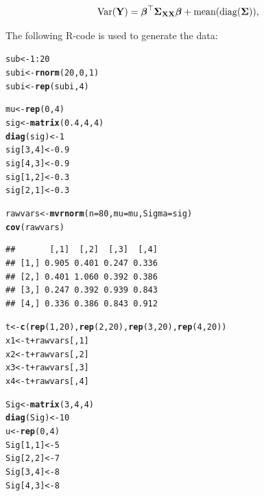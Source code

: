 \documentclass[11pt,a4paper,twoside]{book}\usepackage[]{graphicx}\usepackage[]{color}
\makeatletter
\newcommand{\hlnum}[1]{\textcolor[rgb]{0.686,0.059,0.569}{#1}}%
\newcommand{\hlopt}[1]{\textcolor[rgb]{0,0,0}{#1}}%
\newcommand{\hlstd}[1]{\textcolor[rgb]{0.345,0.345,0.345}{#1}}%
\newcommand{\hlkwb}[1]{\textcolor[rgb]{0.69,0.353,0.396}{#1}}%
\newcommand{\hlkwc}[1]{\textcolor[rgb]{0.333,0.667,0.333}{#1}}%
\newcommand{\hlkwd}[1]{\textcolor[rgb]{0.737,0.353,0.396}{\textbf{#1}}}%
\newenvironment{kframe}{%
 \def\at@end@of@kframe{}%
 \ifinner\ifhmode%
  \def\at@end@of@kframe{\end{minipage}}%
  \begin{minipage}{\columnwidth}%
 \fi\fi%
 \def\FrameCommand##1{\hskip\@totalleftmargin \hskip-\fboxsep
 \colorbox{shadecolor}{##1}\hskip-\fboxsep
     \hskip-\linewidth \hskip-\@totalleftmargin \hskip\columnwidth}%
 \MakeFramed {\advance\hsize-\width
   \@totalleftmargin\z@ \linewidth\hsize
   \@setminipage}}%
 {\par\unskip\endMakeFramed%
 \at@end@of@kframe}
\newenvironment{knitrout}{}{} %
\makeatother
\begin{document}
      \begin{align} 
        \operatorname{Var}({\mathbf{Y}}) = {\boldsymbol{\beta}}^\top {\boldsymbol{\Sigma}}{}_{{\mathbf{X}} {\mathbf{X}}}  {\boldsymbol{\beta}} + \text{mean}(\operatorname{diag}({\boldsymbol{\Sigma}}{})),
   \end{align}

The following R-code is used to generate the data:

\begin{knitrout}
\color{fgcolor}\begin{kframe}
\begin{alltt}
\hlstd{sub}\hlkwb{<-} \hlnum{1}\hlopt{:}\hlnum{20}
\hlstd{subi} \hlkwb{<-} \hlkwd{rnorm}\hlstd{(}\hlnum{20}\hlstd{,} \hlnum{0}\hlstd{,} \hlnum{1}\hlstd{)}
\hlstd{subi}\hlkwb{<-}\hlkwd{rep}\hlstd{(subi,} \hlnum{4}\hlstd{)}

\hlstd{mu} \hlkwb{<-} \hlkwd{rep}\hlstd{(}\hlnum{0}\hlstd{,}\hlnum{4}\hlstd{)}
\hlstd{sig} \hlkwb{<-} \hlkwd{matrix}\hlstd{(}\hlnum{0.4}\hlstd{,} \hlnum{4}\hlstd{,} \hlnum{4}\hlstd{)}
\hlkwd{diag}\hlstd{(sig)} \hlkwb{<-} \hlnum{1}
\hlstd{sig[}\hlnum{3}\hlstd{,}\hlnum{4}\hlstd{]} \hlkwb{<-} \hlnum{0.9}
\hlstd{sig[}\hlnum{4}\hlstd{,}\hlnum{3}\hlstd{]} \hlkwb{<-} \hlnum{0.9}
\hlstd{sig[}\hlnum{1}\hlstd{,}\hlnum{2}\hlstd{]} \hlkwb{<-} \hlnum{0.3}
\hlstd{sig[}\hlnum{2}\hlstd{,}\hlnum{1}\hlstd{]} \hlkwb{<-} \hlnum{0.3}

\hlstd{rawvars} \hlkwb{<-} \hlkwd{mvrnorm}\hlstd{(}\hlkwc{n}\hlstd{=}\hlnum{80}\hlstd{,} \hlkwc{mu}\hlstd{=mu,} \hlkwc{Sigma}\hlstd{=sig)}
\hlkwd{cov}\hlstd{(rawvars)}
\end{alltt}
\begin{verbatim}
##       [,1]  [,2]  [,3]  [,4]
## [1,] 0.905 0.401 0.247 0.336
## [2,] 0.401 1.060 0.392 0.386
## [3,] 0.247 0.392 0.939 0.843
## [4,] 0.336 0.386 0.843 0.912
\end{verbatim}
\begin{alltt}
\hlstd{t} \hlkwb{<-} \hlkwd{c}\hlstd{(}\hlkwd{rep}\hlstd{(}\hlnum{1}\hlstd{,} \hlnum{20}\hlstd{),}\hlkwd{rep}\hlstd{(}\hlnum{2}\hlstd{,}\hlnum{20}\hlstd{),} \hlkwd{rep}\hlstd{(}\hlnum{3}\hlstd{,} \hlnum{20}\hlstd{),} \hlkwd{rep}\hlstd{(}\hlnum{4}\hlstd{,} \hlnum{20}\hlstd{))}
\hlstd{x1} \hlkwb{<-} \hlstd{t}\hlopt{+}\hlstd{rawvars[,}\hlnum{1}\hlstd{]}
\hlstd{x2} \hlkwb{<-} \hlstd{t}\hlopt{+}\hlstd{rawvars[,}\hlnum{2}\hlstd{]}
\hlstd{x3} \hlkwb{<-} \hlstd{t}\hlopt{+}\hlstd{rawvars[,}\hlnum{3}\hlstd{]}
\hlstd{x4} \hlkwb{<-} \hlstd{t}\hlopt{+}\hlstd{rawvars[,}\hlnum{4}\hlstd{]}

\hlstd{Sig}\hlkwb{<-} \hlkwd{matrix}\hlstd{(}\hlnum{3}\hlstd{,} \hlnum{4}\hlstd{,}\hlnum{4}\hlstd{)}
\hlkwd{diag}\hlstd{(Sig)} \hlkwb{<-} \hlnum{10}
\hlstd{u} \hlkwb{<-} \hlkwd{rep}\hlstd{(}\hlnum{0}\hlstd{,} \hlnum{4}\hlstd{)}
\hlstd{Sig[}\hlnum{1}\hlstd{,}\hlnum{1}\hlstd{]} \hlkwb{<-} \hlnum{5}
\hlstd{Sig[}\hlnum{2}\hlstd{,}\hlnum{2}\hlstd{]} \hlkwb{<-} \hlnum{7}
\hlstd{Sig[}\hlnum{3}\hlstd{,}\hlnum{4}\hlstd{]} \hlkwb{<-} \hlnum{8}
\hlstd{Sig[}\hlnum{4}\hlstd{,}\hlnum{3}\hlstd{]} \hlkwb{<-} \hlnum{8}


\end{alltt}
\end{kframe}
\end{knitrout}
\end{document}
